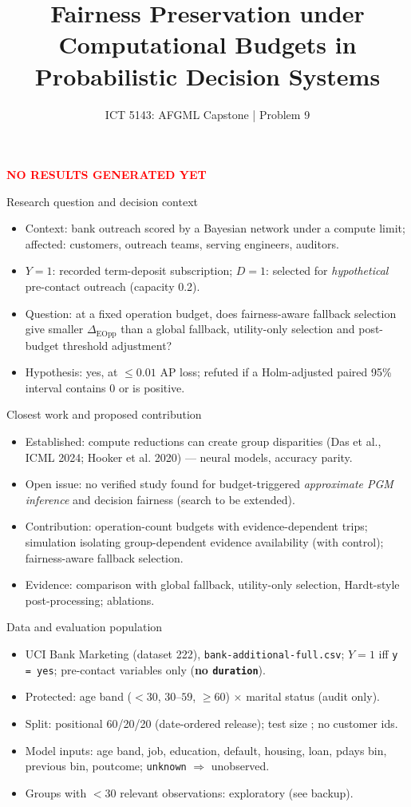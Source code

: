 \documentclass[aspectratio=169,11pt]{beamer}
\title[AFGML Capstone]{Fairness Preservation under Computational Budgets in Probabilistic Decision Systems}
\subtitle{ICT 5143: AFGML Capstone | Problem 9}
\author{\fillin{Student 1, roll number} \and \fillin{Student 2, roll number}}
\date{\fillin{Evaluation date}}
\newcommand{\resBanner}{\textcolor{red}{\textbf{NO RESULTS GENERATED YET}}}
\newcommand{\resCapacity}{0.2}\newcommand{\resSeeds}{5}\newcommand{\resNboot}{1000}
\begin{document}
\begin{frame}\titlepage\resBanner\end{frame}

\begin{frame}{Research question and decision context}
\begin{itemize}
\item Context: bank outreach scored by a Bayesian network under a compute limit; affected: customers, outreach teams, serving engineers, auditors.
\item $Y=1$: recorded term-deposit subscription; $D=1$: selected for \emph{hypothetical} pre-contact outreach (capacity \resCapacity).
\item Question: at a fixed operation budget, does fairness-aware fallback selection give smaller $\Delta_{\mathrm{EOpp}}$ than a global fallback, utility-only selection and post-budget threshold adjustment?
\item Hypothesis: yes, at $\le0.01$ AP loss; refuted if a Holm-adjusted paired 95\% interval contains $0$ or is positive.
\end{itemize}
\end{frame}

\begin{frame}{Closest work and proposed contribution}
\begin{itemize}
\item Established: compute reductions can create group disparities (Das et al., ICML 2024; Hooker et al. 2020) --- neural models, accuracy parity.
\item Open issue: no verified study found for budget-triggered \emph{approximate PGM inference} and decision fairness (search to be extended).
\item Contribution: operation-count budgets with evidence-dependent trips; simulation isolating group-dependent evidence availability (with control); fairness-aware fallback selection.
\item Evidence: comparison with global fallback, utility-only selection, Hardt-style post-processing; ablations.
\end{itemize}
\end{frame}

\begin{frame}{Data and evaluation population}
\begin{itemize}
\item UCI Bank Marketing (dataset 222), \texttt{bank-additional-full.csv}; $Y=1$ iff \texttt{y = yes}; pre-contact variables only (\textbf{no \texttt{duration}}).
\item Protected: age band ($<30$, $30$--$59$, $\ge60$) $\times$ marital status (audit only).
\item Split: positional 60/20/20 (date-ordered release); test size \resNtest; no customer ids.
\item Model inputs: age band, job, education, default, housing, loan, pdays bin, previous bin, poutcome; \texttt{unknown} $\Rightarrow$ unobserved.
\item Groups with $<30$ relevant observations: exploratory (see backup).
\end{itemize}
\end{frame}
\end{document}
